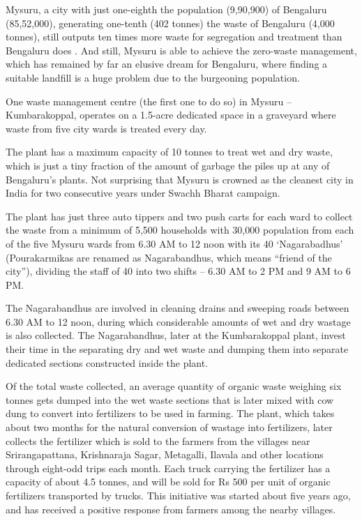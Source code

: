 \documentclass[10pt]{article}
\begin{document}
Mysuru, a city with just one-eighth the population (9,90,900) of Bengaluru (85,52,000), generating one-tenth (402 tonnes) the waste of Bengaluru (4,000 tonnes), still outputs ten times more waste for segregation and treatment than Bengaluru does \citep{BangaloreMirror:MysuruWasteTreatment}. And still, Mysuru is able to achieve the zero-waste management, which has remained by far an elusive dream for Bengaluru, where finding a suitable landfill is a huge problem due to the burgeoning population.

One waste management centre (the first one to do so) in Mysuru – Kumbarakoppal, operates on a 1.5-acre dedicated space in a graveyard where waste from five city wards is treated every day.

The plant has a maximum capacity of 10 tonnes to treat wet and dry waste, which is just a tiny fraction of the amount of garbage the piles up at any of Bengaluru’s plants.
Not surprising that Mysuru is crowned as the cleanest city in India for two consecutive years under Swachh Bharat campaign.

The plant has just three auto tippers and two push carts for each ward to collect the waste from a minimum of 5,500 households with 30,000 population from each of the five Mysuru wards from 6.30 AM to 12 noon with its 40 ‘Nagarabadhus’ (Pourakarmikas are renamed as Nagarabandhus, which means “friend of the city”), dividing the staff of 40 into two shifts – 6.30 AM to 2 PM and 9 AM to 6 PM.

The Nagarabandhus are involved in cleaning drains and sweeping roads between 6.30 AM to 12 noon, during which considerable amounts of wet and dry wastage is also collected.
The Nagarabandhus, later at the Kumbarakoppal plant, invest their time in the separating dry and wet waste and dumping them into separate dedicated sections constructed inside the plant.

Of the total waste collected, an average quantity of organic waste weighing six tonnes gets dumped into the wet waste sections that is later mixed with cow dung to convert into fertilizers to be used in farming.
The plant, which takes about two months for the natural conversion of wastage into fertilizers, later collects the fertilizer which is sold to the farmers from the villages near Srirangapattana, Krishnaraja Sagar, Metagalli, Ilavala and other locations through eight-odd trips each month.
Each truck carrying the fertilizer has a capacity of about 4.5 tonnes, and will be sold for Rs 500 per unit of organic fertilizers transported by trucks.
This initiative was started about five years ago, and has received a positive response from farmers among the nearby villages.
\end{document}
